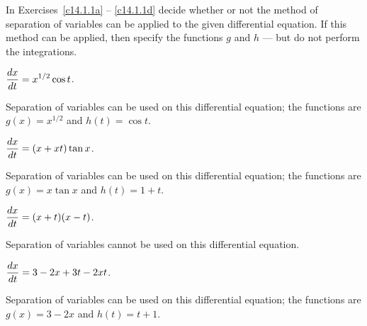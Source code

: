 \documentclass{ximera}
\begin{document}
\TEXER

\noindent In Exercises~\ref{c14.1.1a} -- \ref{c14.1.1d} decide whether 
or not the method of separation of variables can be applied to the given
differential equation.  If this method can be applied, then specify the 
functions $g$ and $h$ --- but do not perform the integrations.
\begin{exercise} \label{c14.1.1a}
$\displaystyle \frac{dx}{dt} = x^{1/2}\cos t$.

\begin{solution}
\ans Separation of variables can be used on this differential
equation; the functions are $g(x) = x^{1/2}$ and $h(t) = \cos t$.

\end{solution}
\end{exercise}
\begin{exercise} \label{c14.1.1b}
$\displaystyle \frac{dx}{dt} = (x+xt)\tan x$.

\begin{solution}
\ans Separation of variables can be used on this differential
equation; the functions are $g(x) = x\tan x$ and $h(t) = 1 + t$.

\end{solution}
\end{exercise}
\begin{exercise} \label{c14.1.1c}
$\displaystyle \frac{dx}{dt} = (x+t)(x-t)$.

\begin{solution}
\ans Separation of variables cannot be used on this
differential equation.

\end{solution}
\end{exercise}
\begin{exercise} \label{c14.1.1d}
$\displaystyle \frac{dx}{dt} = 3-2x+3t-2xt$.

\begin{solution}
\ans Separation of variables can be used on this differential
equation; the functions are $g(x) = 3 - 2x$ and $h(t) = t + 1$.

\end{solution}
\end{exercise}
\end{document}
